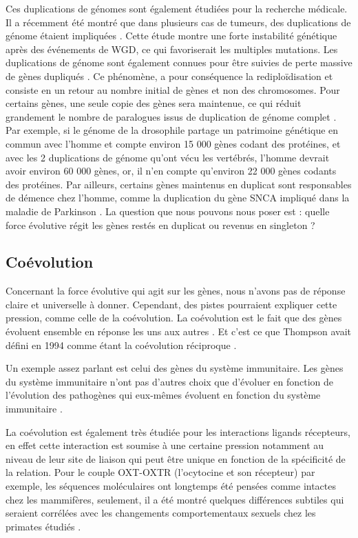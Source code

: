 \par Ces duplications de génomes sont également étudiées pour la recherche médicale. Il a récemment été montré que dans plusieurs cas de tumeurs, des duplications de génome étaient impliquées \parencite{gemble_genetic_2022}. Cette étude montre une forte instabilité génétique après des événements de WGD, ce qui favoriserait les multiples mutations. 
Les duplications de génome sont également connues pour être suivies de perte massive de gènes dupliqués \parencite{inoue_rapid_2015, jaillon_genome_2004}. Ce phénomène, a pour conséquence la rediploïdisation et consiste en un retour au nombre initial de gènes et non des chromosomes. Pour certains gènes, une seule copie des gènes sera maintenue, ce qui réduit grandement le nombre de paralogues issus de duplication de génome complet \parencite{byrne_yeast_2005}. Par exemple, si le génome de la drosophile partage un patrimoine génétique en commun avec l’homme et compte environ 15 000 gènes codant des protéines, et avec les 2 duplications de génome qu’ont vécu les vertébrés, l’homme devrait avoir environ 60 000 gènes, or, il n’en compte qu’environ 22 000 gènes codants des protéines. Par ailleurs, certains gènes maintenus en duplicat sont responsables de démence chez l’homme, comme la duplication du gène SNCA impliqué dans la maladie de Parkinson \parencite{chartier-harlin_alpha-synuclein_2004, ibanez_causal_2004}. 
La question que nous pouvons nous poser est : quelle force évolutive régit les gènes restés en duplicat ou revenus en singleton ? 

\subsection{Coévolution}\label{coevo}
\par Concernant la force évolutive qui agit sur les gènes, nous n’avons pas de réponse claire et universelle à donner. Cependant, des pistes pourraient expliquer cette pression, comme celle de la coévolution. La coévolution est le fait que des gènes évoluent ensemble en réponse les uns aux autres \parencite{lovell_integrated_2010}. Et c'est ce que Thompson avait défini en 1994 comme étant la coévolution réciproque \parencite{thompson_coevolutionary_1994}. 
\par Un exemple assez parlant est celui des gènes du système immunitaire. Les gènes du système immunitaire n’ont pas d’autres choix que d’évoluer en fonction de l’évolution des pathogènes qui eux-mêmes évoluent en fonction du système immunitaire \parencite{schlesinger_coevolutionary_2014}. 
\par La coévolution est également très étudiée pour les interactions ligands récepteurs, en effet cette interaction est soumise à une certaine pression notamment au niveau de leur site de liaison qui peut être unique en fonction de la spécificité de la relation. Pour le couple OXT-OXTR (l’ocytocine et son récepteur) par exemple, les séquences moléculaires ont longtemps été pensées comme intactes chez les mammifères, seulement, il a été montré quelques différences subtiles qui seraient corrélées avec les changements comportementaux sexuels chez les primates étudiés \parencite{vargas-pinilla_evolutionary_2015}.

